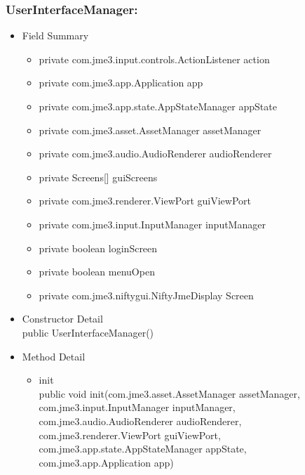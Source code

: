 \documentclass[letterpaper]{article}
\begin{document}
				\subsubsection*{UserInterfaceManager:}
				\vspace{0.1in}	
					\begin{itemize}
						\item	Field Summary
								\begin{itemize}
									\item	private com.jme3.input.controls.ActionListener	action 
									\item	private com.jme3.app.Application	app 
									\item	private com.jme3.app.state.AppStateManager	appState 
									\item	private com.jme3.asset.AssetManager	assetManager 
									\item	private com.jme3.audio.AudioRenderer	audioRenderer 
									\item	private Screens[]	guiScreens 
									\item	private com.jme3.renderer.ViewPort	guiViewPort 
									\item	private com.jme3.input.InputManager	inputManager 
									\item	private boolean	loginScreen 
									\item	private boolean	menuOpen 
									\item	private com.jme3.niftygui.NiftyJmeDisplay	Screen 
								\end{itemize}
						\item	Constructor Detail \\
								public UserInterfaceManager()
						\item	Method Detail
								\begin{itemize}
									\item	init \\
											public void init(com.jme3.asset.AssetManager assetManager, \\
		        com.jme3.input.InputManager inputManager, \\
		        com.jme3.audio.AudioRenderer audioRenderer, \\
		        com.jme3.renderer.ViewPort guiViewPort, \\
		        com.jme3.app.state.AppStateManager appState, \\
		        com.jme3.app.Application app) \\ \\

\end{itemize}
\end{itemize}
\end{document}
